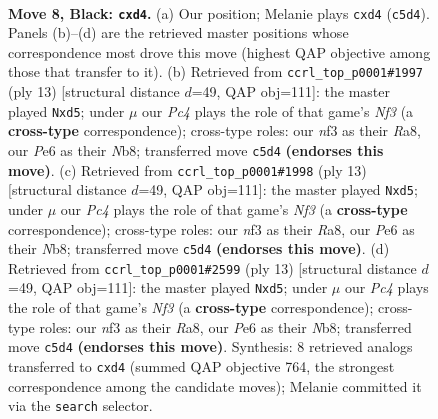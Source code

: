 \documentclass[11pt]{article}
\begin{document}
\begin{figure}[p]\centering
\begin{subfigure}{0.46\textwidth}\centering
\resizebox{\linewidth}{!}{%
\newchessgame
\chessboard[
  setfen={r1bqkb1r/pp3ppp/4pn2/2p5/3P2PP/5N2/PPP2P2/R1BQKB1R b KQkq - 0 8},
  showmover=false,
  pgfstyle=straightmove, color=movearrow, markmove={c5-d4}
]}
\caption{}
\end{subfigure}\hfill
\begin{subfigure}{0.46\textwidth}\centering
\resizebox{\linewidth}{!}{%
\newchessgame
\chessboard[
  setfen={rnbqkb1r/pp3ppp/4pn2/3P4/3N4/8/PPPN1PPP/R1BQKB1R b KQkq - 0 7},
  showmover=false,
  pgfstyle=straightmove, color=movearrow, markmove={f6-d5}
]}
\caption{}
\end{subfigure}
\\[4pt]
\begin{subfigure}{0.46\textwidth}\centering
\resizebox{\linewidth}{!}{%
\newchessgame
\chessboard[
  setfen={rnbqkb1r/pp3ppp/4pn2/3P4/3N4/8/PPPN1PPP/R1BQKB1R b KQkq - 0 7},
  showmover=false,
  pgfstyle=straightmove, color=movearrow, markmove={f6-d5}
]}
\caption{}
\end{subfigure}\hfill
\begin{subfigure}{0.46\textwidth}\centering
\resizebox{\linewidth}{!}{%
\newchessgame
\chessboard[
  setfen={rnbqkb1r/pp3ppp/4pn2/3P4/3N4/8/PPPN1PPP/R1BQKB1R b KQkq - 0 7},
  showmover=false,
  pgfstyle=straightmove, color=movearrow, markmove={f6-d5}
]}
\caption{}
\end{subfigure}
\caption{\textbf{Move 8, Black: \texttt{cxd4}.} (a) Our position; Melanie plays \texttt{cxd4} (\texttt{c5d4}). Panels (b)--(d) are the retrieved master positions whose correspondence most drove this move (highest QAP objective among those that transfer to it). (b) Retrieved from \texttt{ccrl\_top\_p0001\#1997} (ply 13) [structural distance $d$=49, QAP obj=111]: the master played \texttt{Nxd5}; under $\mu$ our \emph{Pc4} plays the role of that game's \emph{Nf3} (a \textbf{cross-type} correspondence); cross-type roles: our \emph{n}f3 as their \emph{R}a8, our \emph{P}e6 as their \emph{N}b8; transferred move \texttt{c5d4} \textbf{(endorses this move)}. (c) Retrieved from \texttt{ccrl\_top\_p0001\#1998} (ply 13) [structural distance $d$=49, QAP obj=111]: the master played \texttt{Nxd5}; under $\mu$ our \emph{Pc4} plays the role of that game's \emph{Nf3} (a \textbf{cross-type} correspondence); cross-type roles: our \emph{n}f3 as their \emph{R}a8, our \emph{P}e6 as their \emph{N}b8; transferred move \texttt{c5d4} \textbf{(endorses this move)}. (d) Retrieved from \texttt{ccrl\_top\_p0001\#2599} (ply 13) [structural distance $d$=49, QAP obj=111]: the master played \texttt{Nxd5}; under $\mu$ our \emph{Pc4} plays the role of that game's \emph{Nf3} (a \textbf{cross-type} correspondence); cross-type roles: our \emph{n}f3 as their \emph{R}a8, our \emph{P}e6 as their \emph{N}b8; transferred move \texttt{c5d4} \textbf{(endorses this move)}. Synthesis: 8 retrieved analogs transferred to \texttt{cxd4} (summed QAP objective 764, the strongest correspondence among the candidate moves); Melanie committed it via the \texttt{search} selector.}
\label{fig:thought-m15}
\end{figure}
\end{document}
